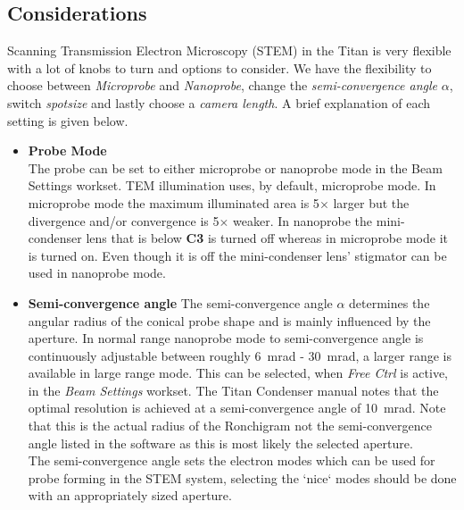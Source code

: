 \documentclass[a4paper]{scrartcl}
\begin{document}
\subsection*{Considerations}
Scanning Transmission Electron Microscopy (STEM) in the Titan is very flexible with a lot of knobs to turn and options to consider. We have the flexibility to choose between \textit{Microprobe} and \textit{Nanoprobe}, change the \textit{semi-convergence angle} $\alpha$, switch \textit{spotsize} and lastly choose a \textit{camera length}. A brief explanation of each setting is given below.\\
\begin{itemize}
	\item {\textbf{Probe Mode}\\
	      The probe can be set to either microprobe or nanoprobe mode in the Beam Settings workset. TEM illumination uses, by default, microprobe mode. In microprobe mode the maximum illuminated area is 5$\times$ larger but the divergence and/or convergence is 5$\times$ weaker. In nanoprobe the mini-condenser lens that is below \textbf{C3} is turned off whereas in microprobe mode it is turned on. Even though it is off the mini-condenser lens' stigmator can be used in nanoprobe mode.}

	      \item{\textbf{Semi-convergence angle}
	                  The semi-convergence angle $\alpha$ determines the angular radius of the conical probe shape and is mainly influenced by the aperture. In normal range nanoprobe mode to semi-convergence angle is continuously adjustable between roughly \SI{6}{\milli \radian} - \SI{30}{\milli \radian}, a larger range is available in large range mode. This can be selected, when \textit{Free Ctrl} is active, in the \textit{Beam Settings} workset. The Titan Condenser manual notes that the optimal resolution is achieved at a semi-convergence angle of \SI{10}{\milli \radian}. Note that this is the actual radius of the Ronchigram not the semi-convergence angle listed in the software as this is most likely the selected aperture.\\
	                  The semi-convergence angle sets the electron modes which can be used for probe forming in the STEM system, selecting the `nice` modes should be done with an appropriately sized aperture.}


\end{itemize}
\end{document}
